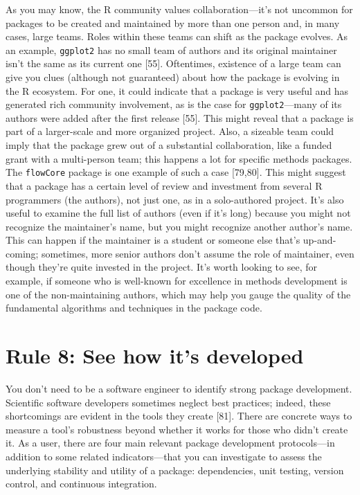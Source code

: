 \documentclass[10pt,letterpaper]{article}
\begin{document}
As you may know, the R community values collaboration---it's not
uncommon for packages to be created and maintained by more than one
person and, in many cases, large teams. Roles within these teams can
shift as the package evolves. As an example, \texttt{ggplot2} has no
small team of authors and its original maintainer isn't the same as its
current one {[}55{]}. Oftentimes, existence of a large team can give you
clues (although not guaranteed) about how the package is evolving in the
R ecosystem. For one, it could indicate that a package is very useful
and has generated rich community involvement, as is the case for
\texttt{ggplot2}---many of its authors were added after the first
release {[}55{]}. This might reveal that a package is part of a
larger-scale and more organized project. Also, a sizeable team could
imply that the package grew out of a substantial collaboration, like a
funded grant with a multi-person team; this happens a lot for specific
methods packages. The \texttt{flowCore} package is one example of such a
case {[}79,80{]}. This might suggest that a package has a certain level
of review and investment from several R programmers (the authors), not
just one, as in a solo-authored project. It's also useful to examine the
full list of authors (even if it's long) because you might not recognize
the maintainer's name, but you might recognize another author's name.
This can happen if the maintainer is a student or someone else that's
up-and-coming; sometimes, more senior authors don't assume the role of
maintainer, even though they're quite invested in the project. It's
worth looking to see, for example, if someone who is well-known for
excellence in methods development is one of the non-maintaining authors,
which may help you gauge the quality of the fundamental algorithms and
techniques in the package code.

\hypertarget{rule-8-see-how-its-developed}{%
\section{Rule 8: See how it's
developed}\label{rule-8-see-how-its-developed}}

You don't need to be a software engineer to identify strong package
development. Scientific software developers sometimes neglect best
practices; indeed, these shortcomings are evident in the tools they
create {[}81{]}. There are concrete ways to measure a tool's robustness
beyond whether it works for those who didn't create it. As a user, there
are four main relevant package development protocols---in addition to
some related indicators---that you can investigate to assess the
underlying stability and utility of a package: dependencies, unit
testing, version control, and continuous integration.
\end{document}
